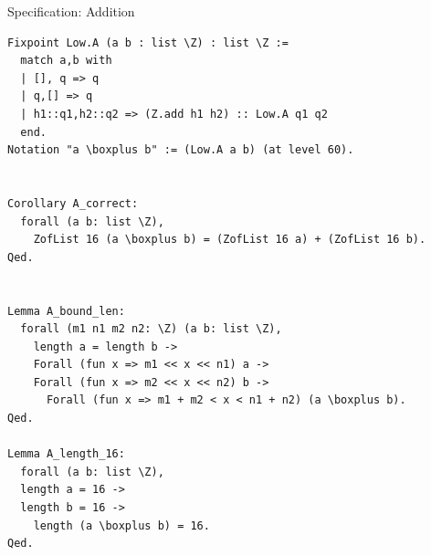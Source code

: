 \documentclass[8pt,aspectratio=169]{beamer}
\begin{document}
%
%
\begin{frame}[fragile]{Specification: Addition}
  \begin{center}
\begin{lstlisting}[language=Coq]
Fixpoint Low.A (a b : list \Z) : list \Z :=
  match a,b with
  | [], q => q
  | q,[] => q
  | h1::q1,h2::q2 => (Z.add h1 h2) :: Low.A q1 q2
  end.
Notation "a \boxplus b" := (Low.A a b) (at level 60).


Corollary A_correct:
  forall (a b: list \Z),
    ZofList 16 (a \boxplus b) = (ZofList 16 a) + (ZofList 16 b).
Qed.


Lemma A_bound_len:
  forall (m1 n1 m2 n2: \Z) (a b: list \Z),
    length a = length b ->
    Forall (fun x => m1 << x << n1) a ->
    Forall (fun x => m2 << x << n2) b ->
      Forall (fun x => m1 + m2 < x < n1 + n2) (a \boxplus b).
Qed.

Lemma A_length_16:
  forall (a b: list \Z),
  length a = 16 ->
  length b = 16 ->
    length (a \boxplus b) = 16.
Qed.
\end{lstlisting}

  \end{center}
\end{frame}
\end{document}
